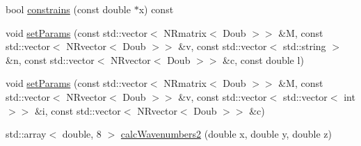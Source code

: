 \begin{DoxyCompactItemize}
\item 
bool \hyperlink{struct_p_r_p_s_evolution_1_1_models_1_1_whole_tomato_reduced_afe4f2433598d1e85df8de4e47bacd514}{constrains} (const double $\ast$x) const 
\item 
void \hyperlink{struct_p_r_p_s_evolution_1_1_models_1_1_whole_tomato_reduced_ab5b7c472a183e4ac7c0141a42a100507}{set\-Params} (const std\-::vector$<$ \-N\-Rmatrix$<$ \-Doub $>$$>$ \&\-M, const std\-::vector$<$ \-N\-Rvector$<$ \-Doub $>$$>$ \&v, const std\-::vector$<$ std\-::string $>$ \&n, const std\-::vector$<$ \-N\-Rvector$<$ \-Doub $>$$>$ \&c, const double l)
\item 
void \hyperlink{struct_p_r_p_s_evolution_1_1_models_1_1_whole_tomato_reduced_a334f8d952de6bc5cbc66828b62672d73}{set\-Params} (const std\-::vector$<$ \-N\-Rmatrix$<$ \-Doub $>$$>$ \&\-M, const std\-::vector$<$ \-N\-Rvector$<$ \-Doub $>$$>$ \&v, const std\-::vector$<$ std\-::vector$<$ int $>$$>$ \&i, const std\-::vector$<$ \-N\-Rvector$<$ \-Doub $>$$>$ \&c)
\item 
std\-::array$<$ double, 8 $>$ \hyperlink{struct_p_r_p_s_evolution_1_1_models_1_1_whole_tomato_reduced_a66f9b57364bddb66dad453a14c3ad22c}{calc\-Wavenumbers2} (double x, double y, double z)
\end{DoxyCompactItemize}



